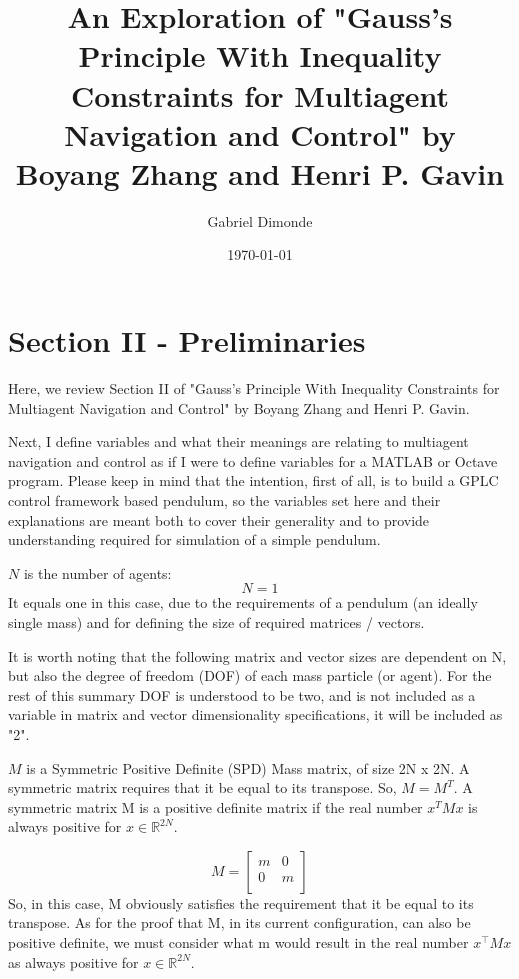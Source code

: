 \documentclass[12pt]{article} %
\title{An Exploration of "Gauss’s Principle With Inequality Constraints for Multiagent Navigation and Control" by Boyang Zhang and Henri P. Gavin}
\author{Gabriel Dimonde}
\date{\today} %
\begin{document}
	
	\maketitle

	
	\section{Section II - Preliminaries}
	Here, we review Section II of "Gauss’s Principle With Inequality Constraints for Multiagent Navigation and Control" by Boyang Zhang and Henri P. Gavin. 
	
	Next, I define variables and what their meanings are relating to multiagent navigation and control as if I were to define variables for a MATLAB or Octave program. Please keep in mind that the intention, first of all, is to build a GPLC control framework based pendulum, so the variables set here and their explanations are meant both to cover their generality and to provide understanding required for simulation of a simple pendulum.
	
	$N$ is the number of agents: 
	\begin{equation}
		N = 1 
	\end{equation}
	It equals one in this case, due to the requirements of a pendulum (an ideally single mass) and for defining the size of required matrices / vectors.

	It is worth noting that the following matrix and vector sizes are dependent on N, but also the degree of freedom (DOF) of each mass particle (or agent). For the rest of this summary DOF is understood to be two, and is not included as a variable in matrix and vector dimensionality specifications, it will be included as "2".

	$M$ is a Symmetric Positive Definite (SPD) Mass matrix, of size 2N x 2N. A symmetric matrix requires that it be equal to its transpose. So, $M = M^T$. A symmetric matrix M is a positive definite matrix if the real number $x^TMx$ is always positive for $x \in \mathbb{R}^{2N}$. 
	
	\begin{equation}
		M = \begin{bmatrix}
			m & 0  \\
			0 & m \\
		\end{bmatrix}
	\end{equation}
	So, in this case,  M obviously satisfies the requirement that it be equal to its transpose. As for the proof that M, in its current configuration, can also be positive definite, we must consider what m would result in the real number $x^\top Mx$ as always positive for $x \in \mathbb{R}^{2N}$. 
	
\end{document}
